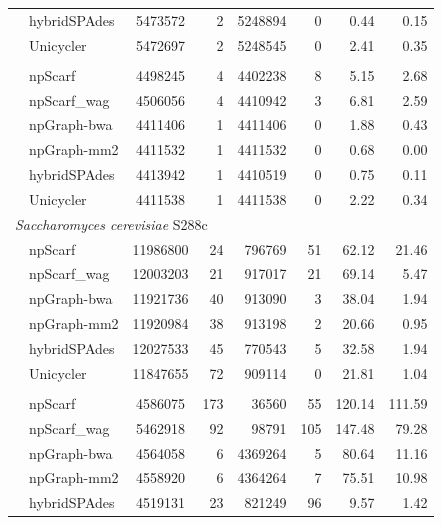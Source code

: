 \documentclass[10pt,letterpaper]{article}
\begin{document}
\begin{longtable}[!hpt]{llcrrrrr}
& hybridSPAdes & 5473572  &  2  &  5248894  &  0  &  0.44 & 0.15\\*
& Unicycler & 5472697  & 2  & 5248545  &  0 & 2.41  &  0.35\\
\hline
\rowcolor{Gray}
\multicolumn{8}{l}{\emph{Mycobacterium tuberculosis} H37Rv} \\* %
\nobreakmidrule
\rowcolor{Gray}
& npScarf &  4498245 &  4  & 4402238   &  8  & 5.15  & 2.68\\*
\rowcolor{Gray}
& npScarf\_wag &  4506056 &  4  &  4410942  &  3  & 6.81  & 2.59\\*
\rowcolor{Gray}
& npGraph-bwa & 4411406  &  1  &  4411406  &  0  & 1.88  & 0.43\\*
\rowcolor{Gray}
& npGraph-mm2 & 4411532  & 1   &  4411532  &  0  & 0.68  & 0.00\\*
\rowcolor{Gray}
& hybridSPAdes & 4413942  &  1  &  4410519  &  0  &  0.75 &  0.11\\*
\rowcolor{Gray}
& Unicycler & 4411538  &  1  &  4411538  &  0  &  2.22 &  0.34\\
\hline
\multicolumn{8}{l}{\emph{Saccharomyces cerevisiae} S288c} \\* %
\nobreakmidrule
& npScarf &  11986800 &  24  &  796769  &  51  &  62.12 & 21.46 \\*
& npScarf\_wag & 12003203  &  21  &  917017  &  21  & 69.14  & 5.47 \\*
& npGraph-bwa & 11921736  &  40  &  913090  &  3 &  38.04 &  1.94\\*
& npGraph-mm2 & 11920984  &  38  &  913198  &  2 &  20.66 &  0.95\\*
& hybridSPAdes &  12027533 &  45  &  770543  &  5  & 32.58  & 1.94\\*
& Unicycler &  11847655 & 72  & 909114  &  0 & 21.81  &  1.04\\
\hline
\rowcolor{Gray}
\multicolumn{8}{l}{\emph{Shigella dysenteriae}  Sd197} \\* %
\nobreakmidrule
\rowcolor{Gray}
& npScarf &  4586075 &  173  & 36560   &  55  & 120.14  & 111.59\\*
\rowcolor{Gray}
& npScarf\_wag & 5462918  &  92  &  98791  &  105  &  147.48 & 79.28\\*
\rowcolor{Gray}
& npGraph-bwa & 4564058  &  6  &  4369264  &  5  & 80.64  & 11.16\\*
\rowcolor{Gray}
& npGraph-mm2 & 4558920  &  6  &  4364264  &  7  & 75.51  & 10.98\\*
\rowcolor{Gray}
& hybridSPAdes &  4519131 & 23   &  821249  & 96   & 9.57  &  1.42\\*

\end{longtable}
\end{document}

